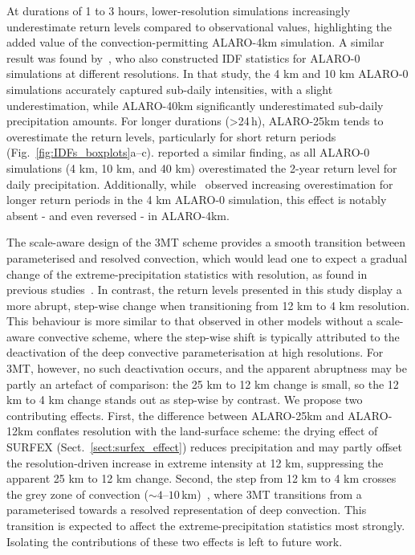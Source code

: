 \documentclass[journal abbreviation, manuscript]{copernicus}
\begin{document}
At durations of 1 to 3 hours, lower-resolution simulations increasingly underestimate return levels compared to observational values, highlighting the added value of the convection-permitting ALARO-4km simulation. 
A similar result was found by~\citet{tabari_local_2016}, who also constructed IDF statistics for ALARO-0 simulations at different resolutions. 
In that study, the 4 km and 10 km ALARO-0 simulations accurately captured sub-daily intensities, with a slight underestimation, while ALARO-40km significantly underestimated sub-daily precipitation amounts. 
For longer durations (>24\,h), ALARO-25km tends to overestimate the return levels, particularly for short return periods (Fig.~\ref{fig:IDFs_boxplots}a--c).
\citet{de_troch_application_2016} reported a similar finding, as all ALARO-0 simulations (4 km, 10 km, and 40 km) overestimated the 2-year return level for daily precipitation. 
Additionally, while~\citet{de_troch_application_2016} observed increasing overestimation for longer return periods in the 4 km ALARO-0 simulation, this effect is notably absent - and even reversed - in ALARO-4km.

The scale-aware design of the 3MT scheme provides a smooth transition between parameterised and resolved convection, which would lead one to expect a gradual change of the extreme-precipitation statistics with resolution, as found in previous studies~\citep{de_troch_application_2016, tabari_local_2016}.
In contrast, the return levels presented in this study display a more abrupt, step-wise change when transitioning from 12 km to 4 km resolution.
This behaviour is more similar to that observed in other models without a scale-aware convective scheme, where the step-wise shift is typically attributed to the deactivation of the deep convective parameterisation at high resolutions.
For 3MT, however, no such deactivation occurs, and the apparent abruptness may be partly an artefact of comparison: the 25 km to 12 km change is small, so the 12 km to 4 km change stands out as step-wise by contrast.
We propose two contributing effects.
First, the difference between ALARO-25km and ALARO-12km conflates resolution with the land-surface scheme: the drying effect of SURFEX (Sect.~\ref{sect:surfex_effect}) reduces precipitation and may partly offset the resolution-driven increase in extreme intensity at 12 km, suppressing the apparent 25 km to 12 km change.
Second, the step from 12 km to 4 km crosses the grey zone of convection ($\sim 4$--$10$\,km)~\citep{prein_review_2015,vergara-temprado_climate_2020}, where 3MT transitions from a parameterised towards a resolved representation of deep convection.
This transition is expected to affect the extreme-precipitation statistics most strongly.
Isolating the contributions of these two effects is left to future work.
\end{document}

